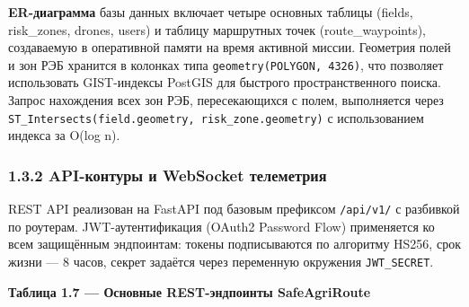 \textbf{ER-диаграмма} базы данных включает четыре основных таблицы (fields, risk\_zones, drones, users) и таблицу маршрутных точек (route\_waypoints), создаваемую в оперативной памяти на время активной миссии. Геометрия полей и зон РЭБ хранится в колонках типа \texttt{geometry(POLYGON,\ 4326)}, что позволяет использовать GIST-индексы PostGIS для быстрого пространственного поиска. Запрос нахождения всех зон РЭБ, пересекающихся с полем, выполняется через \texttt{ST\_Intersects(field.geometry,\ risk\_zone.geometry)} с использованием индекса за O(log n).

\hypertarget{api-ux43aux43eux43dux442ux443ux440ux44b-ux438-websocket-ux442ux435ux43bux435ux43cux435ux442ux440ux438ux44f}{%
\subsubsection{1.3.2 API-контуры и WebSocket телеметрия}\label{api-ux43aux43eux43dux442ux443ux440ux44b-ux438-websocket-ux442ux435ux43bux435ux43cux435ux442ux440ux438ux44f}}

REST API реализован на FastAPI под базовым префиксом \texttt{/api/v1/} с разбивкой по роутерам. JWT-аутентификация (OAuth2 Password Flow) применяется ко всем защищённым эндпоинтам: токены подписываются по алгоритму HS256, срок жизни --- 8 часов, секрет задаётся через переменную окружения \texttt{JWT\_SECRET}.

\textbf{Таблица 1.7 --- Основные REST-эндпоинты SafeAgriRoute}


